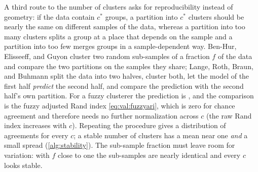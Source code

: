 A third route to the number of clusters asks for reproducibility instead of geometry: if the data contain $c^*$ groups, a partition into $c^*$ clusters should be nearly the same on different samples of the data, whereas a partition into too many clusters splits a group at a place that depends on the sample and a partition into too few merges groups in a sample-dependent way. Ben-Hur, Elisseeff, and Guyon \cite{benhur:2002:stability} cluster two random sub-samples of a fraction $f$ of the data and compare the two partitions on the samples they share; Lange, Roth, Braun, and Buhmann \cite{lange:2004:stability} split the data into two halves, cluster both, let the model of the first half \emph{predict} the second half, and compare the prediction with the second half's own partition. For a fuzzy clusterer the prediction is , and the comparison is the fuzzy adjusted Rand index \eqref{eq:val:fuzzyari}, which is zero for chance agreement and therefore needs no further normalization across $c$ (the raw Rand index increases with $c$). Repeating the procedure gives a distribution of agreements for every $c$; a stable number of clusters has a mean near one \emph{and} a small spread (\cref{alg:stability}). The sub-sample fraction must leave room for variation: with $f$ close to one the sub-samples are nearly identical and every $c$ looks stable.

